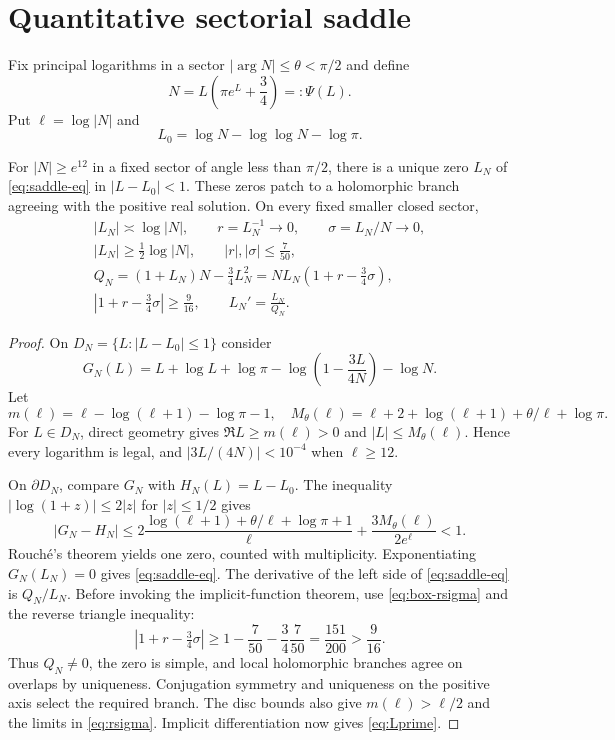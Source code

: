\documentclass[12pt]{article}
\begin{document}
\section{Quantitative sectorial saddle}\label{sec:saddle}

Fix principal logarithms in a sector $|\arg N|\le\theta<\pi/2$ and define
\begin{equation}\label{eq:saddle-eq}
 N=L\left(\pi e^L+\frac34\right)=:\Psi(L).
\end{equation}
Put $\ell=\log|N|$ and
\[
 L_0=\log N-\log\log N-\log\pi.
\]

\begin{lemma}\label{lem:saddle}
For $|N|\ge e^{12}$ in a fixed sector of angle less than $\pi/2$, there is a
unique zero $L_N$ of \eqref{eq:saddle-eq} in $|L-L_0|<1$.  These zeros patch
to a holomorphic branch agreeing with the positive real solution.  On every
fixed smaller closed sector,
\begin{gather}
 |L_N|\asymp\log|N|,\qquad
 r=L_N^{-1}\to0,\qquad \sigma=L_N/N\to0,\label{eq:rsigma}\\
 |L_N|\ge\tfrac12\log|N|,\qquad |r|,|\sigma|\le\frac7{50},\label{eq:box-rsigma}\\
 Q_N=(1+L_N)N-\tfrac34L_N^2
 =NL_N(1+r-\tfrac34\sigma),\label{eq:Q}\\
 |1+r-\tfrac34\sigma|\ge\frac9{16},\qquad
 L_N'=\frac{L_N}{Q_N}.
 \label{eq:Lprime}
\end{gather}
\end{lemma}

\begin{proof}
On $D_N=\{L:|L-L_0|\le1\}$ consider
\[
 G_N(L)=L+\log L+\log\pi
 -\log\left(1-\frac{3L}{4N}\right)-\log N.
\]
Let
\[
 m(\ell)=\ell-\log(\ell+1)-\log\pi-1,
\quad
 M_\theta(\ell)=\ell+2+\log(\ell+1)+\theta/\ell+\log\pi.
\]
For $L\in D_N$, direct geometry gives
$\Re L\ge m(\ell)>0$ and $|L|\le M_\theta(\ell)$.  Hence every logarithm is
legal, and $|3L/(4N)|<10^{-4}$ when $\ell\ge12$.

On $\partial D_N$, compare $G_N$ with $H_N(L)=L-L_0$.  The inequality
$|\log(1+z)|\le2|z|$ for $|z|\le1/2$ gives
\begin{equation}\label{eq:rouche-sum}
 |G_N-H_N|
 \le 2\frac{\log(\ell+1)+\theta/\ell+\log\pi+1}{\ell}
 +\frac{3M_\theta(\ell)}{2e^\ell}<1.
\end{equation}
Rouch\'e's theorem yields one zero, counted with multiplicity.  Exponentiating
$G_N(L_N)=0$ gives \eqref{eq:saddle-eq}.  The derivative of the left side of
\eqref{eq:saddle-eq} is $Q_N/L_N$.  Before invoking the implicit-function
theorem, use \eqref{eq:box-rsigma} and the reverse triangle inequality:
\[
 |1+r-\tfrac34\sigma|
 \ge1-\frac7{50}-\frac34\frac7{50}
 =\frac{151}{200}>\frac9{16}.
\]
Thus $Q_N\ne0$, the zero is simple, and local holomorphic branches agree on
overlaps by uniqueness.  Conjugation symmetry and uniqueness on the positive
axis select the required branch.  The disc bounds also give
$m(\ell)>\ell/2$ and the limits in \eqref{eq:rsigma}.  Implicit
differentiation now gives \eqref{eq:Lprime}.
\end{proof}
\end{document}
